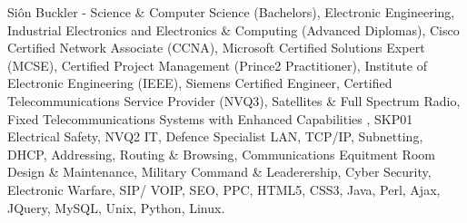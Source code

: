 \documentclass[letterpaper,10pt,openany,oneside,english]{sphinxmanual}
\begin{document}
 Siôn Buckler - Science \& Computer Science (Bachelors), Electronic Engineering, Industrial Electronics and Electronics \& Computing (Advanced Diplomas), Cisco Certified Network Associate (CCNA), Microsoft Certified Solutions Expert (MCSE), Certified Project Management (Prince2 Practitioner), Institute of Electronic Engineering (IEEE), Siemens Certified Engineer, Certified Telecommunications Service Provider (NVQ3), Satellites \& Full Spectrum Radio, Fixed Telecommunications Systems with Enhanced Capabilities , SKP01 Electrical Safety, NVQ2 IT, Defence Specialist LAN, TCP/IP, Subnetting, DHCP, Addressing, Routing \& Browsing, Communications Equitment Room Design \& Maintenance, Military Command \& Leaderership,  Cyber Security, Electronic Warfare, SIP/ VOIP, SEO, PPC, HTML5, CSS3, Java, Perl, Ajax, JQuery, MySQL, Unix, Python, Linux.



\renewcommand{\indexname}{Index}
\printindex
\end{document}
